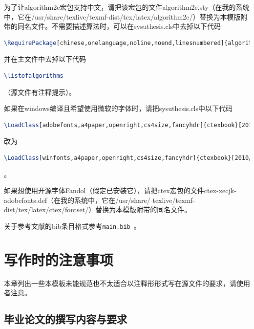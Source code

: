 ﻿\documentclass{sysuthesis}
\begin{document}
为了让{\ttfamily algorithm2e}宏包支持中文，请把该宏包的文件{\ttfamily algorithm2e.sty}（在我的系统中，它在{\ttfamily /usr/share/texlive/texmf-dist/tex/latex/algorithm2e/}）替换为本模版附带的同名文件。不需要描述算法时，可以在{\ttfamily sysuthesis.cls}中去掉以下代码
\begin{lstlisting}[language=TeX, keywordstyle=\color{blue}\bfseries, basicstyle=\ttfamily, breaklines=true, frame=shadowbox]
\RequirePackage[chinese,onelanguage,noline,noend,linesnumbered]{algorithm2e}
\end{lstlisting}
并在主文件中去掉以下代码
\begin{lstlisting}[language=TeX, keywordstyle=\color{blue}\bfseries, basicstyle=\ttfamily, breaklines=true, frame=shadowbox]
\listofalgorithms
\end{lstlisting}
（源文件有注释提示）。

如果在windows编译且希望使用微软的字体时，请把{\ttfamily sysuthesis.cls}中以下代码
\begin{lstlisting}[language=TeX, keywordstyle=\color{blue}\bfseries, basicstyle=\ttfamily, breaklines=true, frame=shadowbox]
\LoadClass[adobefonts,a4paper,openright,cs4size,fancyhdr]{ctexbook}[2010/01/22]
\end{lstlisting}
改为
\begin{lstlisting}[language=TeX, keywordstyle=\color{blue}\bfseries, basicstyle=\ttfamily, breaklines=true, frame=shadowbox]
\LoadClass[winfonts,a4paper,openright,cs4size,fancyhdr]{ctexbook}[2010/01/22]
\end{lstlisting}。

如果想使用开源字体{\ttfamily Fandol}（假定已安装它），请把{\ttfamily ctex}宏包的文件{\ttfamily ctex-xecjk-adobefonts.def}（在我的系统中，它在{\ttfamily /usr/share/ texlive/texmf-dist/tex/latex/ctex/fontset/}）替换为本模版附带的同名文件。

关于参考文献的bib条目格式参考\texttt{main.bib}~\cite{article}\cite{book}\cite{phdthesis}\cite{inproc}\cite{masterthesis}\cite{manual}\cite{report}\cite{database}\cite{software}\cite{standard}\cite{newspaper}\cite{patent}。

\chapter{写作时的注意事项}

本章列出一些本模板未能规范也不太适合以注释形形式写在源文件的要求，请使用者注意。

\section{毕业论文的撰写内容与要求}
\end{document}
